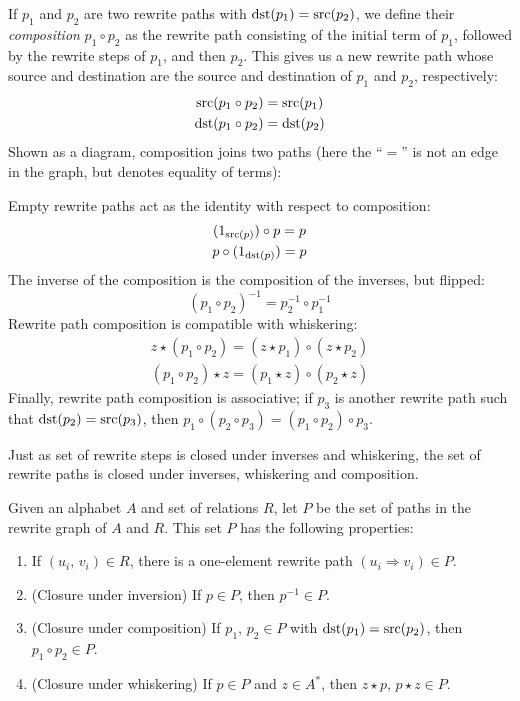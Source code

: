 \documentclass[../generics]{subfiles}
\begin{document}
\begin{definition}
%
If $p_1$ and $p_2$ are two rewrite paths with $\operatorname{dst}(p_1)=\operatorname{src}(p_2)$, we define their \emph{composition} \index{$\circ$}$p_1 \circ p_2$ as the rewrite path consisting of the initial term of $p_1$, followed by the rewrite steps of $p_1$, and then $p_2$. This gives us a new rewrite path whose source and destination are the source and destination of $p_1$ and $p_2$, respectively:
\begin{gather*}
\operatorname{src}(p_1 \circ p_2) = \operatorname{src}(p_1)\\
\operatorname{dst}(p_1 \circ p_2) = \operatorname{dst}(p_2)
\end{gather*}
Shown as a diagram, composition joins two paths (here the ``$=$'' is not an edge in the graph, but denotes equality of terms):
\begin{quote}
\end{quote}
Empty rewrite paths act as the identity with respect to composition:
\begin{gather*}
(1_{\operatorname{src}(p)})\circ p = p\\
p\circ (1_{\operatorname{dst}(p)}) = p
\end{gather*}
The inverse of the composition is the composition of the inverses, but flipped:
\[(p_1 \circ p_2)^{-1} = p_2^{-1} \circ p_1^{-1}\]
Rewrite path composition is compatible with whiskering:
\begin{gather*}
z\star (p_1 \circ p_2) = (z\star p_1) \circ (z\star p_2)\\
(p_1 \circ p_2)\star z = (p_1\star z) \circ (p_2\star z)
\end{gather*}
Finally, rewrite path composition is associative; if $p_3$ is another rewrite path such that $\operatorname{dst}(p_2)=\operatorname{src}(p_3)$, then $p_1 \circ (p_2 \circ p_3) = (p_1 \circ p_2) \circ p_3$.
\end{definition}
Just as set of rewrite steps is closed under inverses and whiskering, the set of rewrite paths is closed under inverses, whiskering and composition.
\begin{proposition}
Given an alphabet $A$ and set of relations $R$, let $P$ be the set of paths in the rewrite graph of $A$ and $R$. This set $P$ has the following properties:
\begin{enumerate}
\item If $(u_i,\,v_i)\in R$, there is a one-element rewrite path $(u_i\Rightarrow v_i)\in P$.
\item (Closure under inversion) If $p\in P$, then $p^{-1}\in P$.
\item (Closure under composition) If $p_1$, $p_2\in P$ with $\operatorname{dst}(p_1)=\operatorname{src}(p_2)$, then $p_1\circ p_2\in P$.
\item (Closure under whiskering) If $p\in P$ and $z\in A^*$, then $z\star p$, $p\star z\in P$.
\end{enumerate}
\end{proposition}
\end{document}

